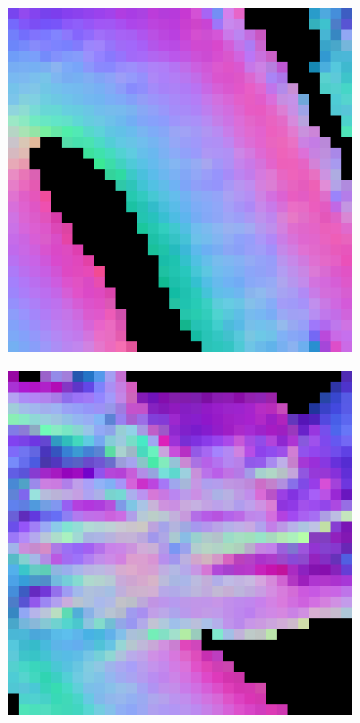 \begin{figure}[th]
	\centering
	\captionsetup{width=\linewidth}
	\begin{subfigure}[b]{0.18\linewidth}
		\includegraphics[width=\linewidth]{./Figures/gcnn_synthetic/eval_7_22_-8_normal.png}
	\end{subfigure}
	\begin{subfigure}[b]{0.18\linewidth}
		\includegraphics[width=\linewidth]{./Figures/gcnn_synthetic/eval_7_2_22_normal.png}

\end{subfigure}
\end{figure}
